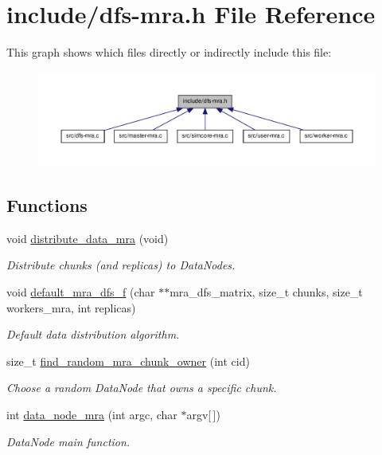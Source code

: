 \hypertarget{dfs-mra_8h}{\section{include/dfs-\/mra.h \-File \-Reference}
\label{dfs-mra_8h}
}
\-This graph shows which files directly or indirectly include this file\-:\nopagebreak
\begin{figure}[H]
\begin{center}
\leavevmode
\includegraphics[width=350pt]{dfs-mra_8h__dep__incl}
\end{center}
\end{figure}
\subsection*{\-Functions}
\begin{DoxyCompactItemize}
\item 
void \hyperlink{dfs-mra_8h_a23d972ed8df40ef6ff709f57e3944042}{distribute\-\_\-data\-\_\-mra} (void)
\begin{DoxyCompactList}\small\item\em \-Distribute chunks (and replicas) to \-Data\-Nodes. \end{DoxyCompactList}\item 
void \hyperlink{dfs-mra_8h_ac144b7da2b0cb2e76cf7226740c54dc1}{default\-\_\-mra\-\_\-dfs\-\_\-f} (char $\ast$$\ast$mra\-\_\-dfs\-\_\-matrix, size\-\_\-t chunks, size\-\_\-t workers\-\_\-mra, int replicas)
\begin{DoxyCompactList}\small\item\em \-Default data distribution algorithm. \end{DoxyCompactList}\item 
size\-\_\-t \hyperlink{dfs-mra_8h_a3f8eddb9dd6200115f7d88325537035e}{find\-\_\-random\-\_\-mra\-\_\-chunk\-\_\-owner} (int cid)
\begin{DoxyCompactList}\small\item\em \-Choose a random \-Data\-Node that owns a specific chunk. \end{DoxyCompactList}\item 
int \hyperlink{dfs-mra_8h_a86d9bef64a7e145c3e00de4e74e8d1c6}{data\-\_\-node\-\_\-mra} (int argc, char $\ast$argv\mbox{[}$\,$\mbox{]})
\begin{DoxyCompactList}\small\item\em \-Data\-Node main function. \end{DoxyCompactList}\end{DoxyCompactItemize}
